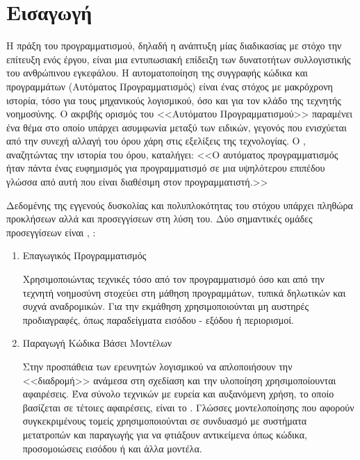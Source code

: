 \chapter{Εισαγωγή}

Η πράξη του προγραμματισμού, δηλαδή η ανάπτυξη μίας διαδικασίας με στόχο την επίτευξη ενός έργου, είναι μια εντυπωσιακή επίδειξη των δυνατοτήτων συλλογιστικής του ανθρώπινου εγκεφάλου.
Η αυτοματοποίηση της συγγραφής κώδικα και προγραμμάτων (Αυτόματος Προγραμματισμός) είναι ένας στόχος με μακρόχρονη ιστορία, τόσο για τους μηχανικούς λογισμικού, όσο και για τον κλάδο της τεχνητής νοημοσύνης.
Ο ακριβής ορισμός του <<Αυτόματου Προγραμματισμού>> παραμένει ένα θέμα στο οποίο υπάρχει ασυμφωνία μεταξύ των ειδικών, γεγονός που ενισχύεται από την συνεχή αλλαγή του όρου χάρη στις εξελίξεις της τεχνολογίας.
Ο , αναζητώντας την ιστορία του όρου, καταλήγει: <<Ο αυτόματος προγραμματισμός ήταν πάντα ένας ευφημισμός για προγραμματισμό σε μια υψηλότερου επιπέδου γλώσσα από αυτή που είναι διαθέσιμη στον προγραμματιστή.>> \cite{Parnas1985}

Δεδομένης της εγγενούς δυσκολίας και πολυπλοκότητας του στόχου υπάρχει πληθώρα προκλήσεων αλλά και προσεγγίσεων στη λύση του.
Δύο σημαντικές ομάδες προσεγγίσεων είναι \cite{Biermann1985}, \cite{Schmidt2006}:

\begin{enumerate}
\item Επαγωγικός Προγραμματισμός  

Χρησιμοποιώντας τεχνικές τόσο από τον προγραμματισμό όσο και από την τεχνητή νοημοσύνη στοχεύει στη μάθηση προγραμμάτων, τυπικά δηλωτικών και συχνά αναδρομικών.
Για την εκμάθηση χρησιμοποιούνται μη αυστηρές προδιαγραφές, όπως παραδείγματα εισόδου - εξόδου ή περιορισμοί.
\item Παραγωγή Κώδικα Βάσει Μοντέλων 

Στην προσπάθεια των ερευνητών λογισμικού να απλοποιήσουν την <<διαδρομή>> ανάμεσα στη σχεδίαση και την υλοποίηση χρησιμοποίουνται αφαιρέσεις.
Ένα σύνολο τεχνικών με ευρεία και αυξανόμενη χρήση, το οποίο βασίζεται σε τέτοιες αφαιρέσεις, είναι το .
Γλώσσες μοντελοποίησης που αφορούν συγκεκριμένους τομείς  χρησιμοποιούνται σε συνδυασμό με συστήματα μετατροπών και παραγωγής  για να φτιάξουν αντικείμενα όπως κώδικα, προσομοιώσεις εισόδου ή και άλλα μοντέλα. 
\end{enumerate}

